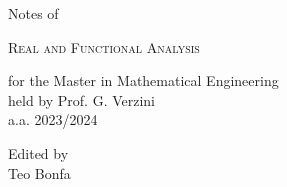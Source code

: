 \documentclass[10pt,a4paper,twoside]{book}
\numberwithin{figure}{chapter}
\numberwithin{equation}{chapter}
\begin{document}
\frontmatter

\pagestyle{empty}


\hypertarget{mytitlepage}{} %

\vspace*{\fill}

\begin{center}


	\vspace*{1.5cm}

	{\large Notes of}\\
	
	\vspace*{1.5cm}
	
	{\Huge \textsc{Real and Functional Analysis}}\\
	
	\vspace*{1.5cm}
	
	{\large for the Master in Mathematical Engineering}\\
	\vspace*{0.3cm}
	{\large held by Prof. G. Verzini}\\
	\vspace*{0.3cm}
	{\large a.a. 2023/2024}\\

	\vspace*{5cm}

	{\large Edited by}\\
	\vspace*{0.3cm}
	{\large Teo Bonfa}\\

	\vspace*{1.5cm}

\end{center}
\vspace*{\fill}
\clearpage


\hypertarget{mycopyright}{} %

\clearpage


\cleardoublepage
\pagestyle{toc}
\hypertarget{mytoc}{} %
\bookmark[dest=mytoc,level=chapter]{\contentsname} %
\tableofcontents
\cleardoublepage
\end{document}
